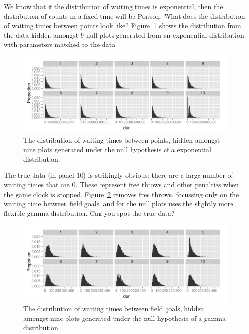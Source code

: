 \documentclass[oneside]{article}
\begin{document}
We know that if the distribution of waiting times is exponential, then the distribution of counts in a fixed time will be Poisson.  What does the distribution of waiting times between points look like? Figure~\ref{fig:exponential} shows the distribution from the data hidden amongst 9 null plots generated from an exponential distribution with parameters matched to the data.

\begin{figure}[htbp]
  \centering
    \includegraphics[width=\linewidth]{exponential}
  \caption{The distribution of waiting times between points, hidden amongst nine plots generated under the null hypothesis of a exponential distribution.}
  \label{fig:exponential}
\end{figure}

The true data (in panel 10) is strikingly obvious: there are a large number of waiting times that are 0. These represent free throws and other penalties when the game clock is stopped. Figure~\ref{fig:gamma} removes free throws, focussing only on the waiting time between field goals, and for the null plots uses the slightly more flexible gamma distribution. Can you spot the true data?

\begin{figure}[htbp]
  \centering
    \includegraphics[width=\linewidth]{gamma}
  \caption{The distribution of waiting times between field goals, hidden amongst nine plots generated under the null hypothesis of a gamma distribution.}
  \label{fig:gamma}
\end{figure}
\end{document}
